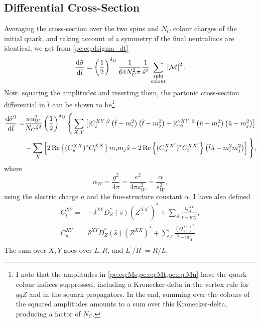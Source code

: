 \documentclass[../main.tex]{subfiles}
\begin{document}
\subsection{Differential Cross-Section}
Averaging the cross-section over the two spins and \(N_C\) colour charges of the initial quark, and taking account of a symmetry if the final neutralinos are identical, we get from \cref{pc:eq:dsigma_dt}
\begin{equation}
  \label{pc:eq:dxsec}
  \d[\hat{t}]{\hat{\sigma}} = \pclosed{\frac{1}{2}}^{\delta_{ij}} \frac{1}{64 N_C^2 \pi} \frac{1}{\hat{s}^2} \sum_{\substack{\text{spin}\\\text{colour}}} \abs{\M}^2.
\end{equation}
Now, squaring the amplitudes and inserting them, the partonic cross-section differential in \(\hat{t}\) can be shown to be\footnote{I note that the amplitudes in \cref{pc:eq:Ms,pc:eq:Mt,pc:eq:Mu} have the quark colour indices suppressed, including a Kronecker-delta in the vertex rule for \(qqZ\) and in the squark propagators. In the end, summing over the colours of the squared amplitudes amounts to a sum over this Kronecker-delta, producing a factor of \(N_C\).}
\begin{align}
  \label{pc:eq:dsigma0_dt}
  \nonumber
  \d[\hat{t}]{\hat{\sigma}^0} = & \frac{\pi \alpha_W^2}{N_C \hat{s}^2}
  \pclosed{\frac{1}{2}}^{\delta_{ij}} \Bigg\{ \sum_{X,Y}
  \bclosed{|C^{XY}_{\hat{t}}|^2
  \pclosed{\hat{t}-m_i^2}\pclosed{\hat{t}-m_j^2} +
  |C^{XY}_{\hat{u}}|^2
  \pclosed{\hat{u}-m_i^2}\pclosed{\hat{u}-m_j^2}}                      \\
                                & - \sum_X
  \bclosed{2\Re{(C_{u}^{XX})^\ast C_{t}^{XX}} m_i m_j \hat{s} -
    2\Re{(C_{u}^{XX^\prime})^\ast C_{t}^{XX^\prime}}
    \pclosed{\hat{t}\hat{u} - m_i^2m_j^2}} \Bigg\},
\end{align}
where
\begin{equation}
  \alpha_W = \frac{g^2}{4\pi} = \frac{e^2}{4\pi s_W^2} = \frac{\alpha}{s_W^2},
\end{equation}
using the electric charge \(a\) and the fine-structure constant \(\alpha\).
I have also defined
\begin{subequations}
  \begin{align}
    C_{\hat{t}}^{XY} = & -\delta^{XY} D_Z^\ast(\hat{s}) (Z^{XX^\prime})^\ast + \sum_{A}\frac{Q_A^{XY}}{\hat{t}-m_A^2}, \\
    C_{\hat{u}}^{XY} = & \delta^{XY} D_Z^\ast(\hat{s}) (Z^{XX})^\ast + \sum_{A}\frac{(Q_A^{XY})^\ast}{\hat{t}-m_A^2}.  \\
  \end{align}
\end{subequations}
The sum over \(X, Y\) goes over \(L, R\), and \(L^\prime/R^\prime = R/L\).
\end{document}
